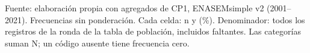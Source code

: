 \begin{table}[!htbp]
\begin{tabular}{p{0.28\linewidth}rrrrrr}
\bottomrule
\end{tabular}
\par\medskip
\parbox{\linewidth}{\footnotesize Fuente: elaboración propia con agregados de CP1, ENASEMsimple v2 (2001--2021). Frecuencias sin ponderación. Cada celda: n y (\%). Denominador: todos los registros de la ronda de la tabla de población, incluidos faltantes. Las categorías suman N; un código ausente tiene frecuencia cero.}
\end{table}
